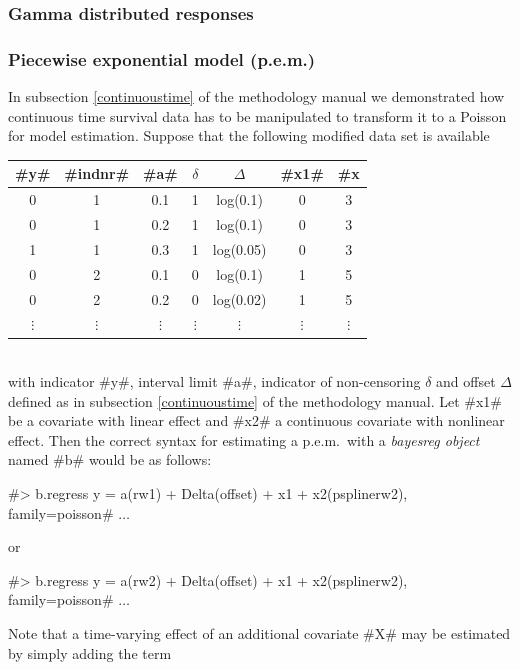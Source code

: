 \subsubsection*{Gamma distributed responses}






\subsubsection*{Piecewise exponential model (p.e.m.)}

In subsection \ref*{continuoustime} of the methodology manual we
demonstrated how continuous time survival data has to be
manipulated to transform it to a Poisson for model estimation.
Suppose that the following modified data set is available
\vspace{0.5cm}\\
\begin{tabular}{c|c|c|c|c|c|c}
#y# & #indnr# & #a# & $\delta$ &  $\Delta$ &   #x1# &
#x#2\\\hline\hline
0 &  1 &   0.1 &   1  &  log(0.1) & 0  & 3\\
0  & 1   & 0.2  &  1  &  log(0.1) & 0 &  3\\
1  & 1   & 0.3  &  1  &  log(0.05)& 0  & 3\\\hline
0 &  2 &   0.1 &   0 &   log(0.1) & 1 &  5\\
0  & 2  &  0.2 &   0  &  log(0.02)& 1 &  5\\\hline
$\vdots$ & $\vdots$ & $\vdots$ & $\vdots$ & $\vdots$ & $\vdots$& $\vdots$\\
\end{tabular}
\vspace{0.5cm}\\
with indicator #y#, interval limit #a#, indicator of non-censoring
$\delta$ and offset $\Delta$ defined as in subsection
\ref*{continuoustime} of the methodology manual. Let #x1# be a
covariate with linear effect and #x2# a continuous covariate with
nonlinear effect. Then the correct syntax for estimating a
p.e.m.~with a {\em bayesreg object} named #b#  would be as
follows:

 #> b.regress y = a(rw1) + Delta(offset) + x1 + x2(psplinerw2), family=poisson# $\ldots$

or

 #> b.regress y = a(rw2) + Delta(offset) + x1 + x2(psplinerw2), family=poisson# $\ldots$


Note that a time-varying effect of an additional covariate #X# may
be estimated by simply adding the term

